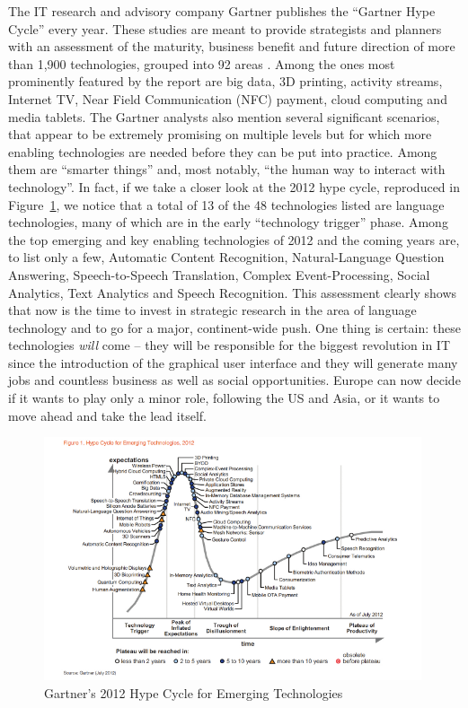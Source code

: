 \documentclass[10pt, plain]{../../metanetpaper}
\begin{document}
\begin{multicols}{2}
The IT research and advisory company Gartner publishes the ``Gartner Hype Cycle'' every year. These studies are meant to provide strategists and planners with an assessment of the maturity, business benefit and future direction of more than 1,900 technologies, grouped into 92 areas \cite{gartner2012}. Among the ones most prominently featured by the report are big data, 3D printing, activity streams, Internet TV, Near Field Communication (NFC) payment, cloud computing and media tablets. The Gartner analysts also mention several significant scenarios, that appear to be extremely promising on multiple levels but for which more enabling technologies are needed before they can be put into practice. Among them are  ``smarter things'' and, most notably, ``the human way to interact with technology''. In fact, if we take a closer look at the 2012 hype cycle, reproduced in Figure~\ref{fig:hype-cycle}, we notice that a total of 13 of the 48 technologies listed are language technologies, many of which are in the early ``technology trigger'' phase. Among the top emerging and key enabling technologies of 2012 and the coming years are, to list only a few, Automatic Content Recognition, Natural-Language Question Answering, Speech-to-Speech Translation, Complex Event-Processing, Social Analytics, Text Analytics and Speech Recognition. This assessment clearly shows that now is the time to invest in strategic research in the area of language technology and to go for a major, continent-wide push. One thing is certain: these technologies \emph{will} come -- they will be responsible for the biggest revolution in IT since the introduction of the graphical user interface and they will generate many jobs and countless business as well as social opportunities. Europe can now decide if it wants to play only a minor role, following the US and Asia, or it wants to move ahead and take the lead itself.
\end{multicols}

\begin{figure}[htb]
  \center
  \includegraphics[width=0.99\textwidth]{../_media/Gartner-2012-Hype-Cycle}
  \caption{Gartner's 2012 Hype Cycle for Emerging Technologies \cite{gartner2012}}
  \label{fig:hype-cycle}
\end{figure}
\end{document}

